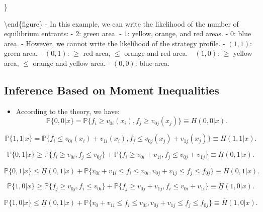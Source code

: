 \documentclass[
]{book}
\providecommand{\tightlist}{%
  \setlength{\itemsep}{0pt}\setlength{\parskip}{0pt}}
\begin{document}
\}

\textbackslash end\{figure\}
- In this example, we can write the likelihood of the number of equilibrium entrants:
- \(2\): green area.
- \(1\): yellow, orange, and red areas.
- \(0\): blue area.
- However, we cannot write the likelihood of the strategy profile.
- \((1, 1)\): green area.
- \((0, 1)\): \(\ge\) red area, \(\le\) orange and red area.
- \((1, 0)\): \(\ge\) yellow area, \(\le\) orange and yellow area.
- \((0, 0)\): blue area.

\hypertarget{inference-based-on-moment-inequalities}{%
\subsection{Inference Based on Moment Inequalities}\label{inference-based-on-moment-inequalities}}

\begin{itemize}
\tightlist
\item
  According to the theory, we have:
  \[
  \mathbb{P}\{0, 0|x\} = \mathbb{P}\{f_{i} \ge v_{0i}(x_{i}), f_{j} \ge v_{0j}(x_{j})\} \equiv H(0, 0|x).
  \]
\end{itemize}

\[
\mathbb{P}\{1, 1|x\} = \mathbb{P}\{f_{i} \le v_{0i}(x_{i}) + v_{1i}(x_{i}), f_{j} \le v_{0j}(x_{j}) + v_{1j}(x_{j}) \} \equiv H(1, 1|x).
\]

\[
\mathbb{P}\{0, 1|x\} \ge \mathbb{P}\{f_{i} \ge v_{0i}, f_{j} \le v_{0j}\} + \mathbb{P}\{f_{i} \ge v_{0i} + v_{1i}, f_{j} \le v_{0j} + v_{1j}\} \equiv \underline{H}(0, 1|x).
\]

\[
\mathbb{P}\{0, 1|x\} \le \underline{H}(0, 1|x) + \mathbb{P}\{v_{0i} + v_{1i} \le f_{i} \le v_{0i}, v_{0j} + v_{1j} \le f_{j} \le f_{0j}\} \equiv \overline{H}(0, 1|x).
\]

\[
\mathbb{P}\{1, 0|x\} \ge \mathbb{P}\{f_{j} \ge v_{0j}, f_{i} \le v_{0i}\} + \mathbb{P}\{f_{j} \ge v_{0j} + v_{1j}, f_{i} \le v_{0i} + v_{1i}\} \equiv \underline{H}(1, 0|x).
\]

\[
\mathbb{P}\{1, 0|x\} \le \underline{H}(0, 1|x) + \mathbb{P}\{v_{0} + v_{1i} \le f_{i} \le v_{0i}, v_{0j} + v_{1j} \le f_{j} \le f_{0j}\} \equiv \overline{H}(1, 0|x).
\]
\end{document}
